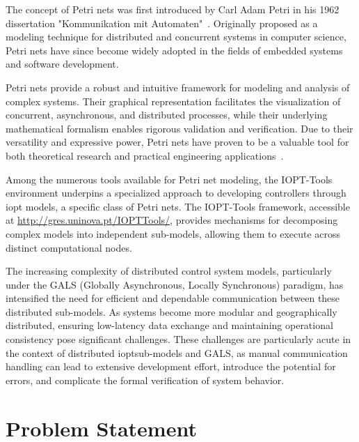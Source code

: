 The concept of Petri nets was first introduced by Carl Adam Petri in his 1962 dissertation "Kommunikation mit Automaten"~\cite{petri1962}. Originally proposed as a modeling technique for distributed and concurrent systems in computer science, Petri nets have since become widely adopted in the fields of embedded systems and software development.

Petri nets provide a robust and intuitive framework for modeling and analysis of complex systems. Their graphical representation facilitates the visualization of concurrent, asynchronous, and distributed processes, while their underlying mathematical formalism enables rigorous validation and verification. Due to their versatility and expressive power, Petri nets have proven to be a valuable tool for both theoretical research and practical engineering applications~\cite{murata}.

Among the numerous tools available for Petri net modeling, the IOPT-Tools environment underpins a specialized approach to developing controllers through \gls{iopt} models, a specific class of Petri nets. The IOPT-Tools framework, accessible at \url{http://gres.uninova.pt/IOPTTools/}, provides mechanisms for decomposing complex models into independent sub-models, allowing them to execute across distinct computational nodes.

The increasing complexity of distributed control system models, particularly under the GALS (Globally Asynchronous, Locally Synchronous) paradigm, has intensified the need for efficient and dependable communication between these distributed sub-models. As systems become more modular and geographically distributed, ensuring low-latency data exchange and maintaining operational consistency pose significant challenges. These challenges are particularly acute in the context of distributed \gls{iopt}sub-models and GALS, as manual communication handling can lead to extensive development effort, introduce the potential for errors, and complicate the formal verification of system behavior.

\section{Problem Statement}
\label{sec:problem_statement}


